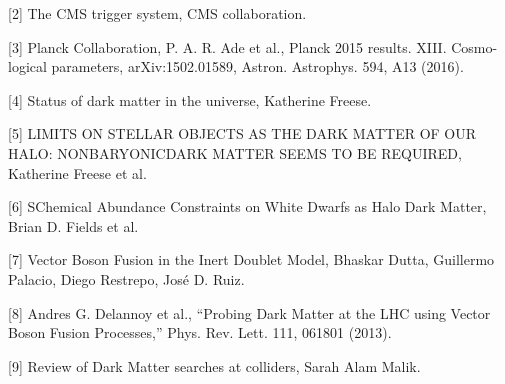 \newpage




[2] The CMS trigger system, CMS collaboration.

\vspace{0.5cm}

[3] Planck Collaboration, P. A. R. Ade et al., Planck 2015 results. XIII. Cosmo-
logical parameters, arXiv:1502.01589, Astron. Astrophys. 594, A13 (2016).

\vspace{0.5cm}

[4] Status of dark matter in the universe, Katherine Freese.

\vspace{0.5cm}

[5] LIMITS ON STELLAR OBJECTS AS THE DARK MATTER OF OUR HALO: NONBARYONICDARK MATTER SEEMS TO BE REQUIRED, Katherine Freese et al.

\vspace{0.5cm}

[6] SChemical Abundance Constraints on White Dwarfs as Halo Dark Matter, Brian D. Fields et al.

\vspace{0.5cm}

[7] Vector Boson Fusion in the Inert Doublet Model, Bhaskar Dutta, Guillermo Palacio, Diego Restrepo, José D. Ruiz.

\vspace{0.5cm}

[8] Andres G. Delannoy et al., “Probing Dark Matter at the LHC using Vector Boson Fusion
Processes,” Phys. Rev. Lett. 111, 061801 (2013).

\vspace{0.5cm}

[9] Review of Dark Matter searches at colliders, Sarah Alam Malik.



